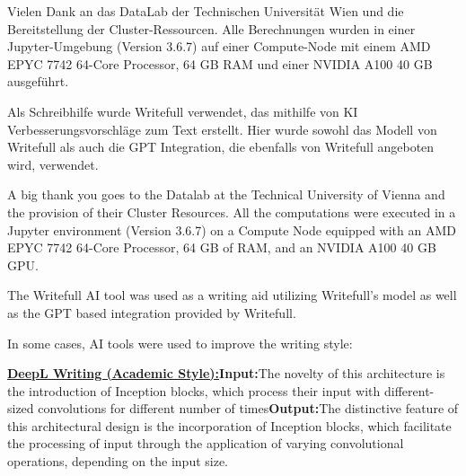 \documentclass[draft,final]{vutinfth} %
\begin{document}
\newcommand{\aitool}[3]{
\textbf{\underline{#1:}}\vspace{.8em}\newline\textbf{Input:}\vspace{.3em}\newline#2\vspace{.6em}\newline \textbf{Output:}\vspace{.3em}\newline#3}


\frontmatter %

\addstatementpage

\begin{danksagung*}
Vielen Dank an das DataLab der Technischen Universität Wien und die Bereitstellung der Cluster-Ressourcen. Alle Berechnungen wurden in einer Jupyter-Umgebung (Version 3.6.7) auf einer Compute-Node mit einem AMD EPYC 7742 64-Core Processor, 64 GB RAM und einer NVIDIA A100 40 GB ausgeführt.

Als Schreibhilfe wurde Writefull verwendet, das mithilfe von KI Verbesserungsvorschläge zum Text erstellt. Hier wurde sowohl das Modell von Writefull als auch die GPT Integration, die ebenfalls von Writefull angeboten wird, verwendet.

\end{danksagung*}

\begin{acknowledgements*}
A big thank you goes to the Datalab at the Technical University of Vienna and the provision of their Cluster Resources. All the computations were executed in a Jupyter environment (Version 3.6.7) on a Compute Node equipped with an AMD EPYC 7742 64-Core Processor, 64 GB of RAM, and an NVIDIA A100 40 GB GPU.

The Writefull AI tool was used as a writing aid utilizing Writefull's model as well as the GPT based integration provided by Writefull.

In some cases, AI tools were used to improve the writing style:

\aitool{DeepL Writing (Academic Style)}{The novelty of this architecture is the introduction of Inception blocks, which process their input with different-sized convolutions for different number of times}{The distinctive feature of this architectural design is the incorporation of Inception blocks, which facilitate the processing of input through the application of varying convolutional operations, depending on the input size.}
\end{acknowledgements*}
\end{document}
